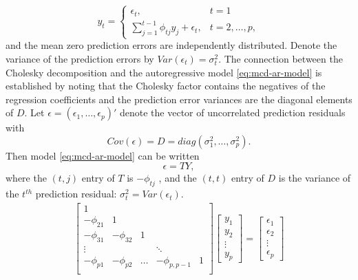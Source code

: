 \begin{equation} \label{eq:mcd-ar-model}
y_t = \left\{ \begin{array}{ll} \epsilon_t, & t = 1\\
\sum_{j = 1}^{t-1} \phi_{tj} y_j + \epsilon_t, & t = 2, \dots, p,
\end{array}\right.
\end{equation}
\noindent
and the mean zero prediction errors are independently distributed. Denote the variance of the prediction errors by $Var\left(\epsilon_t\right) = \sigma_t^2 $. The connection between the Cholesky decomposition and the autoregressive model \eqref{eq:mcd-ar-model} is established by noting that the Cholesky factor contains the negatives of the regression coefficients and the prediction error variances are the diagonal elements of $D$.  Let $\epsilon = \left(\epsilon_1, \dots, \epsilon_p\right)'$ denote the vector of uncorrelated prediction residuals with
\[
Cov\left(\epsilon\right) = D = diag\left(\sigma_1^2,\dots, \sigma_p^2\right).
\]
\noindent
Then model \eqref{eq:mcd-ar-model} can be written 
\begin{equation} \label{eq:e-equals-T-Y}
\epsilon = TY,
\end{equation}
\noindent
where the $\left(t, j\right)$ entry of $T$ is $-\phi_{tj}$ , and the $(t, t)$ entry of $D$ is the variance of the $t^{th}$ prediction residual: $\sigma_t^2 = Var\left(\epsilon_t\right)$. 
\begin{align}
\begin{bmatrix}
1&&&&\\
-\phi_{21}&1&&&\\
-\phi_{31}&-\phi_{32}&1&&\\
\vdots &&&\ddots& \\
-\phi_{p1}&-\phi_{p2}& \dots & -\phi_{p,p-1}&1\\
\end{bmatrix}
\begin{bmatrix}
y_1 \\
y_2 \\ \vdots \\ y_p
\end{bmatrix} = \begin{bmatrix}
\epsilon_1 \\
\epsilon_2 \\ \vdots \\ \epsilon_p
\end{bmatrix}
\end{align}


